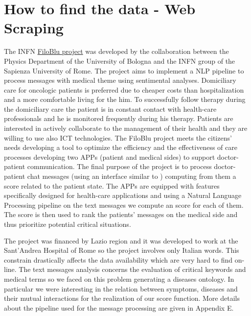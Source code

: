\documentclass{standalone}
\begin{document}
\section[Web Scraping]{How to find the data - Web Scraping}\label{chimera:web_scraping}

The INFN \href{https://agenda.infn.it/event/16961/contributions/34949/attachments/24579/28029/filoblu_0312.pdf}{FiloBlu project} was developed by the collaboration between the Physics Department of the University of Bologna and the INFN group of the Sapienza University of Rome.
The project aims to implement a NLP pipeline to process messages with medical theme using sentimental analyses.
Domiciliary care for oncologic patients is preferred due to cheaper costs than hospitalization and a more comfortable living for the him.
To successfully follow therapy during the domiciliary care the patient is in constant contact with health-care professionals and he is monitored frequently during his therapy.
Patients are interested in actively collaborate to the management of their health and they are willing to use also ICT technologies.
The FiloBlu project meets the citizens' needs developing a tool to optimize the efficiency and the effectiveness of care processes developing two APPs (patient and medical sides) to support doctor-patient communication.
The final purpose of the project is to process doctor-patient chat messages (using an interface similar to ) computing from them a score related to the patient state.
The APPs are equipped with features specifically designed for health-care applications and using a Natural Language Processing pipeline on the text messages we compute an  score for each of them.
The  score is then used to rank the patients' messages on the medical side and thus prioritize potential critical situations.

The project was financed by Lazio region and it was developed to work at the Sant'Andrea Hospital of Rome so the project involves only Italian words.
This constrain drastically affects the data availability which are very hard to find on-line.
The text messages analysis concerns the evaluation of critical keywords and medical terms so we faced on this problem generating a diseases ontology.
In particular we were interesting in the relation between symptoms, diseases and their mutual interactions for the realization of our score function.
More details about the pipeline used for the message processing are given in Appendix E.
\end{document}
